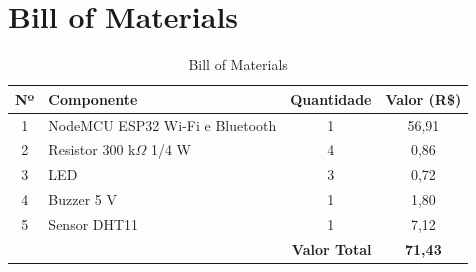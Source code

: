 \section{Bill of Materials}

\begin{table}[H]
    \centering
    \begin{tabular}{|c|l|c|c|}
        \hline
        \textbf{Nº} & \textbf{Componente} & \textbf{Quantidade} & \textbf{Valor (R\$)} \\
        \hline
        1 & NodeMCU ESP32 Wi-Fi e Bluetooth & 1 & 56,91 \\
        \hline
        2 & Resistor 300 k$\Omega$ 1/4 W & 4 & 0,86 \\
        \hline
        3 & LED & 3 & 0,72 \\
        \hline
        4 & Buzzer 5 V & 1 & 1,80 \\
        \hline
        5 & Sensor DHT11 & 1 & 7,12 \\
        \hline
        \multicolumn{3}{|r|}{\textbf{Valor Total}} & \textbf{71,43} \\
        \hline
    \end{tabular}
    \caption{Bill of Materials}
    \label{tab:bom}
\end{table}